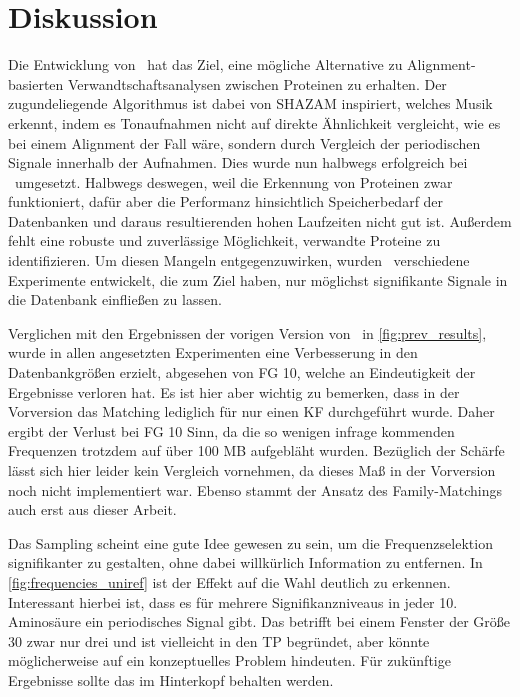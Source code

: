 \section{Diskussion} %
    \label{sec:diskussion}
    Die Entwicklung von \protfin\ hat das Ziel, eine mögliche Alternative zu Alignment-basierten Verwandtschaftsanalysen zwischen Proteinen zu erhalten. Der zugundeliegende Algorithmus ist dabei von SHAZAM inspiriert, welches Musik erkennt, indem es Tonaufnahmen nicht auf direkte Ähnlichkeit vergleicht, wie es bei einem Alignment der Fall wäre, sondern durch Vergleich der periodischen Signale innerhalb der Aufnahmen. Dies wurde nun halbwegs erfolgreich bei \protfin\ umgesetzt. Halbwegs deswegen, weil die Erkennung von Proteinen zwar funktioniert, dafür aber die Performanz hinsichtlich Speicherbedarf der Datenbanken und daraus resultierenden hohen Laufzeiten nicht gut ist. Außerdem fehlt eine robuste und zuverlässige Möglichkeit, verwandte Proteine zu identifizieren. Um diesen Mangeln entgegenzuwirken, wurden \theexperiment\ verschiedene Experimente entwickelt, die zum Ziel haben, nur möglichst signifikante Signale in die Datenbank einfließen zu lassen.

    Verglichen mit den Ergebnissen der vorigen Version von \protfin\ in \autoref{fig:prev_results}, wurde in allen angesetzten Experimenten eine Verbesserung in den Datenbankgrößen erzielt, abgesehen von \acf{FG} 10, welche an Eindeutigkeit der Ergebnisse verloren hat. Es ist hier aber wichtig zu bemerken, dass in der Vorversion das Matching lediglich für nur einen \acf{KF} durchgeführt wurde. Daher ergibt der Verlust bei \ac{FG} 10 Sinn, da die so wenigen infrage kommenden Frequenzen trotzdem auf über 100 \acs{MB} aufgebläht wurden. Bezüglich der Schärfe lässt sich hier leider kein Vergleich vornehmen, da dieses Maß in der Vorversion noch nicht implementiert war. Ebenso stammt der Ansatz des Family-Matchings auch erst aus dieser Arbeit.

    Das Sampling scheint eine gute Idee gewesen zu sein, um die Frequenzselektion signifikanter zu gestalten, ohne dabei willkürlich Information zu entfernen. In \autoref{fig:frequencies_uniref} ist der Effekt auf die Wahl deutlich zu erkennen. Interessant hierbei ist, dass es für mehrere Signifikanzniveaus in jeder 10. Aminosäure ein periodisches Signal gibt. Das betrifft bei einem Fenster der Größe 30 zwar nur drei und ist vielleicht in den \acf{TP} begründet, aber könnte möglicherweise auf ein konzeptuelles Problem hindeuten. Für zukünftige Ergebnisse sollte das im Hinterkopf behalten werden.

